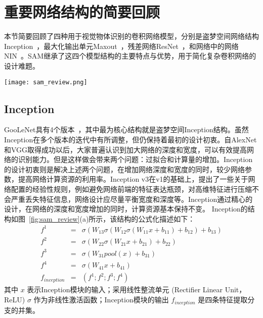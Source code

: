 \section{重要网络结构的简要回顾}
\label{sec:sap:review}

本节简要回顾了四种用于视觉物体识别的卷积网络模型，分别是盗梦空间网络结构Inception~\cite{szegedy2014going,szegedy2015rethinking,szegedy2016inception}，最大化输出单元Maxout~\cite{goodfellow2013maxout}，残差网络ResNet~\cite{he2015deep}，和网络中的网络NIN~\cite{DBLP:journals/corr/LinCY13}。SAM继承了这四个模型结构的主要特点与优势，用于简化复杂卷积网络的设计难题。

\begin{figure*}[t]
\centering
\texttt{[image: sam\_review.png]}
\caption{重要网络结构的简要回顾. (a) Inception, (b) ResNet, (c) Maxout, (d) NIN}
\label{fig:sam_review}
\end{figure*}

\subsection{Inception}
\label{sec:sap:review:inception}

GooLeNet具有4个版本~\cite{szegedy2014going,ioffe2015batch,szegedy2015rethinking,szegedy2016inception}，其中最为核心结构就是盗梦空间Inception结构。虽然Inception在多个版本的迭代中有所调整，但仍保持着最初的设计初衷。自AlexNet和VGG取得成功以后，大家普遍认识到加大网络的深度和宽度，可以有效提高网络的识别能力。但是这样做会带来两个问题：过拟合和计算量的增加。Inception的设计初衷则是解决上述两个问题，在增加网络深度和宽度的同时，较少网络参数，提高网络计算资源的利用率。Inception v3在v1的基础上，提出了一些关于网络配置的经验性规则，例如避免网络前端的特征表达瓶颈，对高维特征进行压缩不会严重丢失特征信息，网络设计应尽量平衡宽度和深度等。Inception通过精心的设计，在网络的深度和宽度增加的同时，计算资源基本保持不变。 Inception的结构如图~\ref{fig:sam_review}(a)所示，该结构的公式化描述如下：
\begin{eqnarray} \label{equ:inception}
f^{1} &=& \sigma(W_{13}\sigma(W_{12}\sigma(W_{11}x+b_{11})+b_{12})+b_{13})\nonumber\\
f^{2} &=& \sigma(W_{22}\sigma(W_{21}x+b_{21})+b_{22})\nonumber\\
f^{3} &=& \sigma(W_{31}pool(x)+b_{31})\nonumber\\
f^{4} &=& \sigma(W_{41}x+b_{41})\nonumber\\
f_{inception} &=& (f^1; f^2; f^3; f^4)
\end{eqnarray}
其中 $x$ 表示Inception模块的输入；采用线性整流单元 (Rectifier Linear Unit，ReLU) $\sigma$ 作为非线性激活函数；Inception模块的输出 $f_{inception}$ 是四条特征提取分支的并集。

